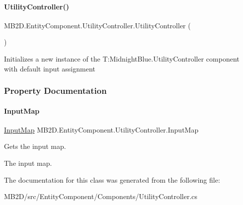 \paragraph{\texorpdfstring{Utility\+Controller()}{UtilityController()}}
{\footnotesize\ttfamily M\+B2\+D.\+Entity\+Component.\+Utility\+Controller.\+Utility\+Controller (\begin{DoxyParamCaption}{ }\end{DoxyParamCaption})\hspace{0.3cm}{\ttfamily [inline]}}



Initializes a new instance of the T\+:\+Midnight\+Blue.\+Utility\+Controller component with default input assignment 



\subsubsection{Property Documentation}
\hypertarget{class_m_b2_d_1_1_entity_component_1_1_utility_controller_a33211d8d414f44a6c320db8f73623882}{}\label{class_m_b2_d_1_1_entity_component_1_1_utility_controller_a33211d8d414f44a6c320db8f73623882} 
\paragraph{\texorpdfstring{Input\+Map}{InputMap}}
{\footnotesize\ttfamily \hyperlink{class_m_b2_d_1_1_i_o_1_1_input_map}{Input\+Map} M\+B2\+D.\+Entity\+Component.\+Utility\+Controller.\+Input\+Map\hspace{0.3cm}{\ttfamily [get]}}



Gets the input map. 

The input map.

The documentation for this class was generated from the following file\+:\begin{DoxyCompactItemize}
\item 
M\+B2\+D/src/\+Entity\+Component/\+Components/Utility\+Controller.\+cs\end{DoxyCompactItemize}
